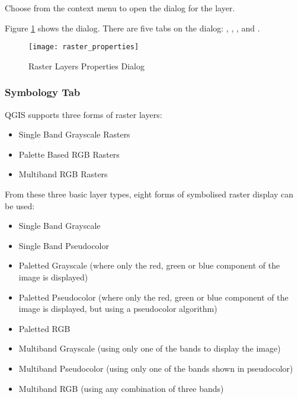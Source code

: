 Choose  from the context menu to open the
dialog for the layer.

Figure \ref{fig:raster_properties} shows the  dialog. There are five
tabs on the dialog: , , ,  and .

\begin{figure}[h]
   \begin{center}
   \caption{Raster Layers Properties
Dialog}\label{fig:raster_properties}\smallskip
   \texttt{[image: raster\_properties]}
\end{center}  
\end{figure}

\subsubsection{Symbology Tab}\label{label_sombology}

QGIS supports three forms of raster layers:

\begin{itemize}
\item Single Band Grayscale Rasters
\item Palette Based RGB Rasters
\item Multiband RGB Rasters
\end{itemize}

From these three basic layer types, eight forms of symbolised raster display
can be used:

\begin{itemize}
\item Single Band Grayscale
\item Single Band Pseudocolor
\item Paletted Grayscale (where only the red, green or blue component of the
image is displayed)
\item Paletted Pseudocolor (where only the red, green or blue component of the
image is displayed, but using a pseudocolor algorithm)
\item Paletted RGB
\item Multiband Grayscale (using only one of the bands to display the image)
\item Multiband Pseudocolor (using only one of the bands shown in
pseudocolor)
\item Multiband RGB (using any combination of three bands)
\end{itemize}

